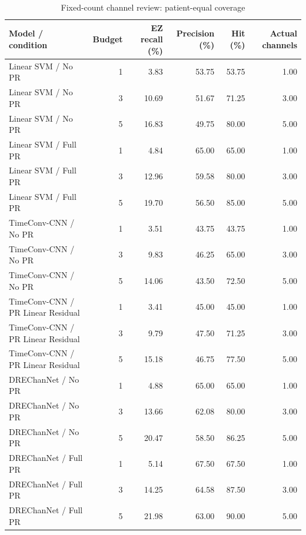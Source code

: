 \begin{table}[t]
\centering
\caption{Fixed-count channel review: patient-equal coverage}
\small
\begin{tabular}{lrrrrr}
\toprule
Model / condition & Budget & EZ recall (\%) & Precision (\%) & Hit (\%) & Actual channels \\
\midrule
Linear SVM / No PR & 1 & 3.83 & 53.75 & 53.75 & 1.00 \\
Linear SVM / No PR & 3 & 10.69 & 51.67 & 71.25 & 3.00 \\
Linear SVM / No PR & 5 & 16.83 & 49.75 & 80.00 & 5.00 \\
Linear SVM / Full PR & 1 & 4.84 & 65.00 & 65.00 & 1.00 \\
Linear SVM / Full PR & 3 & 12.96 & 59.58 & 80.00 & 3.00 \\
Linear SVM / Full PR & 5 & 19.70 & 56.50 & 85.00 & 5.00 \\
TimeConv-CNN / No PR & 1 & 3.51 & 43.75 & 43.75 & 1.00 \\
TimeConv-CNN / No PR & 3 & 9.83 & 46.25 & 65.00 & 3.00 \\
TimeConv-CNN / No PR & 5 & 14.06 & 43.50 & 72.50 & 5.00 \\
TimeConv-CNN / PR Linear Residual & 1 & 3.41 & 45.00 & 45.00 & 1.00 \\
TimeConv-CNN / PR Linear Residual & 3 & 9.79 & 47.50 & 71.25 & 3.00 \\
TimeConv-CNN / PR Linear Residual & 5 & 15.18 & 46.75 & 77.50 & 5.00 \\
DREChanNet / No PR & 1 & 4.88 & 65.00 & 65.00 & 1.00 \\
DREChanNet / No PR & 3 & 13.66 & 62.08 & 80.00 & 3.00 \\
DREChanNet / No PR & 5 & 20.47 & 58.50 & 86.25 & 5.00 \\
DREChanNet / Full PR & 1 & 5.14 & 67.50 & 67.50 & 1.00 \\
DREChanNet / Full PR & 3 & 14.25 & 64.58 & 87.50 & 3.00 \\
DREChanNet / Full PR & 5 & 21.98 & 63.00 & 90.00 & 5.00 \\
\bottomrule
\end{tabular}
\end{table}
